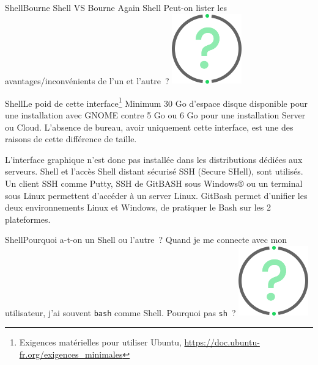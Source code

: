 \documentclass{beamer}
\begin{document}
    \begin{frame}{Shell}{Bourne Shell VS Bourne Again Shell}
        Peut-on lister les avantages/inconvénients de l'un et l'autre~?
        \bigbreak
        \centering
        \includegraphics[width=3cm]{image/question-mark}
    \end{frame}

    \begin{frame}{Shell}{Le poid de cette interface\footnote{Exigences matérielles pour utiliser Ubuntu, \url{https://doc.ubuntu-fr.org/exigences_minimales}}}
        Minimum 30 Go d'espace disque disponible pour une installation avec GNOME contre 5 Go ou 6 Go pour une installation Server ou Cloud.
        \bigbreak
        L'absence de bureau, avoir uniquement cette interface, est une des raisons de cette différence de taille.

        L'interface graphique n'est donc pas installée dans les distributions dédiées aux serveurs.
        Shell et l'accès Shell distant sécurisé SSH (Secure SHell), sont utilisés.
        Un client SSH comme Putty, SSH de GitBASH sous Windows® ou un terminal sous Linux permettent d'accéder à un server Linux.
        \bigbreak
        GitBash permet d'unifier les deux environnements Linux et Windows, de pratiquer le Bash sur les 2 plateformes.
    \end{frame}

    \begin{frame}{Shell}{Pourquoi a-t-on un Shell ou l'autre~?}
        Quand je me connecte avec mon utilisateur, j'ai souvent \lstinline{bash} comme Shell.
        Pourquoi pas \lstinline{sh}~?
        \bigbreak
        \centering
        \includegraphics[width=3cm]{image/question-mark}
    \end{frame}
\end{document}
